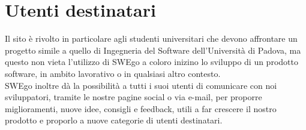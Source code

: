 \section{Utenti destinatari}
Il sito è rivolto in particolare agli studenti universitari che devono affrontare un progetto simile a quello di Ingegneria del Software dell'Università di Padova, ma questo non vieta l'utilizzo di SWEgo a coloro inizino lo sviluppo di un prodotto software, in ambito lavorativo o in qualsiasi altro contesto. \\
SWEgo inoltre dà la possibilità a tutti i suoi utenti di comunicare con noi sviluppatori, tramite le nostre pagine social o via e-mail, per proporre miglioramenti, nuove idee, consigli e feedback, utili a far crescere il nostro prodotto e proporlo a nuove categorie di utenti destinatari.